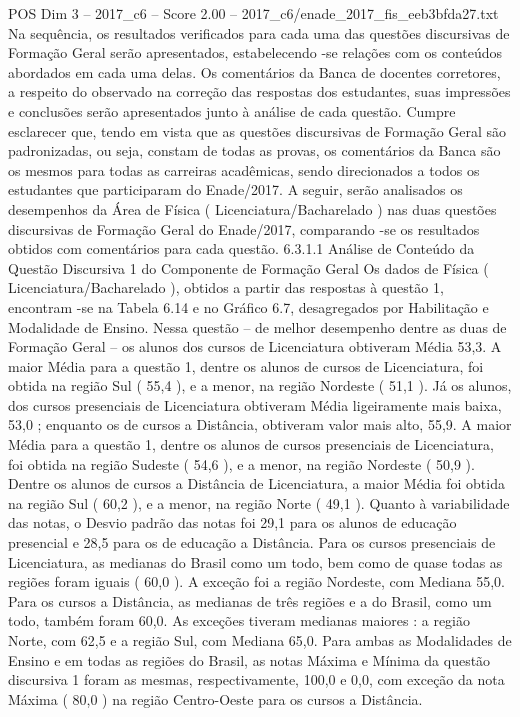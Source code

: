 \begin{textsample}{POS Dim 3 – 2017\_c6 – Score 2.00 – 2017\_c6/enade\_2017\_fis\_eeb3bfda27.txt}
Na sequência, os resultados verificados para cada uma das questões discursivas de Formação Geral serão apresentados, estabelecendo -se relações com os conteúdos abordados em cada uma delas.
Os comentários da Banca de docentes corretores, a respeito do observado na correção das respostas dos estudantes, suas impressões e conclusões serão apresentados junto à análise de cada questão.
Cumpre esclarecer que, tendo em vista que as questões discursivas de Formação Geral são padronizadas, ou seja, constam de todas as provas, os comentários da Banca são os mesmos para todas as carreiras acadêmicas, sendo direcionados a todos os estudantes que participaram do Enade/2017.
A seguir, serão analisados os desempenhos da Área de Física ( Licenciatura/Bacharelado ) nas duas questões discursivas de Formação Geral do Enade/2017, comparando -se os resultados obtidos com comentários para cada questão. 6.3.1.1 Análise de Conteúdo da Questão Discursiva 1 do Componente de Formação Geral Os dados de Física ( Licenciatura/Bacharelado ), obtidos a partir das respostas à questão 1, encontram -se na Tabela 6.14 e no Gráfico 6.7, desagregados por Habilitação e Modalidade de Ensino.
Nessa questão – de melhor desempenho dentre as duas de Formação Geral – os alunos dos cursos de Licenciatura obtiveram Média 53,3.
A maior Média para a questão 1, dentre os alunos de cursos de Licenciatura, foi obtida na região Sul ( 55,4 ), e a menor, na região Nordeste ( 51,1 ).
Já os alunos, dos cursos presenciais de Licenciatura obtiveram Média ligeiramente mais baixa, 53,0 ; enquanto os de cursos a Distância, obtiveram valor mais alto, 55,9.
A maior Média para a questão 1, dentre os alunos de cursos presenciais de Licenciatura, foi obtida na região Sudeste ( 54,6 ), e a menor, na região Nordeste ( 50,9 ).
Dentre os alunos de cursos a Distância de Licenciatura, a maior Média foi obtida na região Sul ( 60,2 ), e a menor, na região Norte ( 49,1 ).
Quanto à variabilidade das notas, o Desvio padrão das notas foi 29,1 para os alunos de educação presencial e 28,5 para os de educação a Distância.
Para os cursos presenciais de Licenciatura, as medianas do Brasil como um todo, bem como de quase todas as regiões foram iguais ( 60,0 ).
A exceção foi a região Nordeste, com Mediana 55,0.
Para os cursos a Distância, as medianas de três regiões e a do Brasil, como um todo, também foram 60,0.
As exceções tiveram medianas maiores : a região Norte, com 62,5 e a região Sul, com Mediana 65,0.
Para ambas as Modalidades de Ensino e em todas as regiões do Brasil, as notas Máxima e Mínima da questão discursiva 1 foram as mesmas, respectivamente, 100,0 e 0,0, com exceção da nota Máxima ( 80,0 ) na região Centro-Oeste para os cursos a Distância.

\end{textsample}
